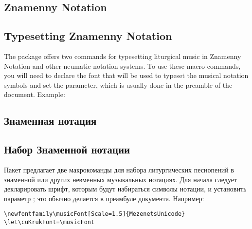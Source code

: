 \begin{EN}
\section{Znamenny Notation}
\subsection{Typesetting Znamenny Notation}
The package offers two commands for typesetting liturgical music in Znamenny Notation and other neumatic notation systems. To use these macro commands, you will need to declare the font that will be used to typeset the musical notation symbols and set the  parameter, which is usually done in the preamble of the document. Example:
\end{EN}
%
\begin{RU}
\section{Знаменная нотация}
\subsection{Набор Знаменной нотации}
Пакет предлагает две макрокоманды для набора литургических песнопений в знаменной или других невменных музыкальных нотациях. Для начала следует декларировать шрифт, которым будут набираться символы нотации, и установить параметр ; это обычно делается в преамбуле документа. Например:
\end{RU}

\label{znamenny}
\begin{verbatim}
\newfontfamily\musicFont[Scale=1.5]{MezenetsUnicode}
\let\cuKrukFont=\musicFont
\end{verbatim}

